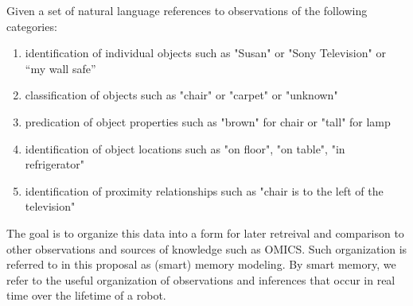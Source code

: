 \documentclass[12pt]{amsart}
\begin{document}
Given a set of natural language references to observations of the
following categories:

\begin{enumerate}
 
\item
 identification of individual objects such as "Susan" or "Sony
Television" or ``my wall safe''
\item
 classification of objects such as "chair" or "carpet" or
"unknown"
\item
 predication of object properties such as "brown" for chair or
"tall" for lamp
\item
 identification of object locations such as "on floor", "on table",
"in refrigerator"
\item
 identification of proximity relationships such as "chair is to the
left of the television"
 \end{enumerate}

The goal is to organize this data into a form for later retreival and
comparison to other observations and sources of knowledge such as
OMICS.  Such organization is referred to in this proposal as (smart) memory
modeling.  By smart memory, we refer to the useful organization of
observations and inferences that occur in real time over the lifetime
of a robot. 
\end{document}
